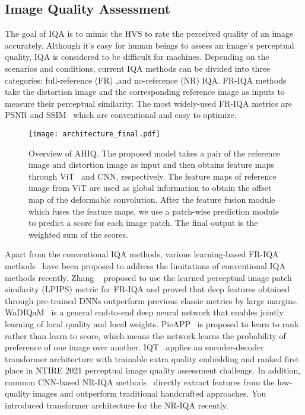 \documentclass[10pt,twocolumn,letterpaper]{article}
\begin{document}
\subsection{Image Quality Assessment}
The goal of IQA is to mimic the HVS to rate the perceived quality of an image accurately. Although it's easy for human beings to assess an image's perceptual quality, IQA is considered to be difficult for machines. Depending on the scenarios and conditions, current IQA methods can be divided into three categories: full-reference (FR) ,and no-reference (NR) IQA. FR-IQA methods take the distortion image and the corresponding reference image as inputs to measure their perceptual similarity. The most widely-used FR-IQA metrics are PSNR and SSIM~\cite{wang2004image} which are conventional and easy to optimize.
\begin{figure*}[th]
  \centering
\texttt{[image: architecture\_final.pdf]}
   \caption{Overview of AHIQ. The proposed model takes a pair of the reference image and distortion image as input and then obtains feature maps through ViT~\cite{dosovitskiy2020image} and CNN, respectively. The feature maps of reference image from ViT are used as global information to obtain the offset map of the deformable convolution\cite{dai2017deformable}. After the feature fusion module which fuses the feature maps, we use a patch-wise prediction module to predict a score for each image patch. The final output is the weighted sum of the scores.}
   \label{fig1:arch}
\end{figure*}
Apart from the conventional IQA methods, various learning-based FR-IQA methods~\cite{zhang2018unreasonable,bosse2017deep,prashnani2018pieapp} have been proposed to address the limitations of conventional IQA methods recently. Zhang \etal~\cite{zhang2018unreasonable} proposed to use the learned perceptual image patch similarity (LPIPS) metric for FR-IQA and proved that deep features obtained through pre-trained DNNs outperform previous classic metrics by large margins. WaDIQaM~\cite{bosse2017deep} is a general end-to-end deep neural network that enables jointly learning of local quality and local weights. PieAPP~\cite{prashnani2018pieapp} is proposed to learn to rank rather than learn to score, which means the network learns the probability of preference of one image over another. IQT~\cite{cheon2021perceptual} applies an encoder-decoder transformer architecture with trainable extra quality embedding and ranked first place in NTIRE 2021 perceptual image quality assessment challenge. In addition, common CNN-based NR-IQA methods~\cite{su2020blindly,wu2020end,xia2020domain} directly extract features from the low-quality images and outperform traditional handcrafted approaches. You \etal~\cite{ you2021transformer} introduced transformer architecture for the NR-IQA recently.
\end{document}
